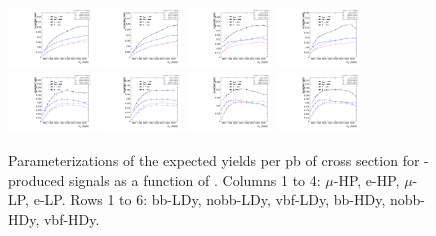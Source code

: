 \begin{figure}[htbp]
  \includegraphics[width=0.2\textwidth]{fig/2Dfit/paramSignalYield_VBFSig_mu_HP_nobb_HDy.pdf}
  \includegraphics[width=0.2\textwidth]{fig/2Dfit/paramSignalYield_VBFSig_e_HP_nobb_HDy.pdf}
  \includegraphics[width=0.2\textwidth]{fig/2Dfit/paramSignalYield_VBFSig_mu_LP_nobb_HDy.pdf}
  \includegraphics[width=0.2\textwidth]{fig/2Dfit/paramSignalYield_VBFSig_e_LP_nobb_HDy.pdf}\\
  \includegraphics[width=0.2\textwidth]{fig/2Dfit/paramSignalYield_VBFSig_mu_HP_vbf_HDy.pdf}
  \includegraphics[width=0.2\textwidth]{fig/2Dfit/paramSignalYield_VBFSig_e_HP_vbf_HDy.pdf}
  \includegraphics[width=0.2\textwidth]{fig/2Dfit/paramSignalYield_VBFSig_mu_LP_vbf_HDy.pdf}
  \includegraphics[width=0.2\textwidth]{fig/2Dfit/paramSignalYield_VBFSig_e_LP_vbf_HDy.pdf}\\
  \caption{
    Parameterizations of the expected yields per pb of cross section for \VBF-produced signals as a function of \MX.
    Columns 1 to 4: $\mu$-HP, e-HP, $\mu$-LP, e-LP.
    Rows 1 to 6: bb-LDy, nobb-LDy, vbf-LDy, bb-HDy, nobb-HDy, vbf-HDy.
  }
  \label{fig:YieldParam_VBF_Run2}
\end{figure}

